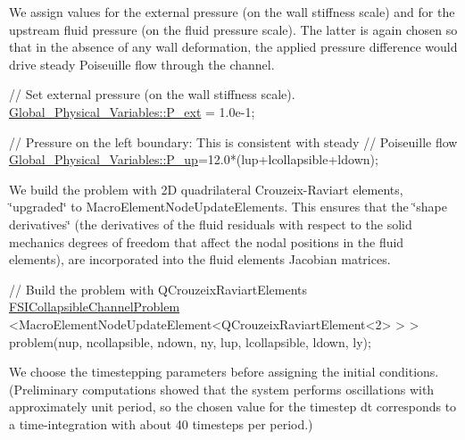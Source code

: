 We assign values for the external pressure (on the wall stiffness scale) and for the upstream fluid pressure (on the fluid pressure scale). The latter is again chosen so that in the absence of any wall deformation, the applied pressure difference would drive steady Poiseuille flow through the channel.


\begin{DoxyCodeInclude}
 
 \textcolor{comment}{// Set external pressure (on the wall stiffness scale). }
 \hyperlink{namespaceGlobal__Physical__Variables_a0406c0cbd463d1df2458fe5de98a00eb}{Global\_Physical\_Variables::P\_ext} = 1.0e-1;
 
 \textcolor{comment}{// Pressure on the left boundary: This is consistent with steady}
 \textcolor{comment}{// Poiseuille flow}
 \hyperlink{namespaceGlobal__Physical__Variables_ae1a493695b7f4619af32f405b0b28861}{Global\_Physical\_Variables::P\_up}=12.0*(lup+lcollapsible+ldown);

\end{DoxyCodeInclude}


We build the problem with 2D quadrilateral Crouzeix-\/\+Raviart elements, \char`\"{}upgraded\char`\"{} to {\ttfamily Macro\+Element\+Node\+Update\+Elements}. This ensures that the \char`\"{}shape
derivatives\char`\"{} (the derivatives of the fluid residuals with respect to the solid mechanics degrees of freedom that affect the nodal positions in the fluid elements), are incorporated into the fluid elements\textquotesingle{} Jacobian matrices.


\begin{DoxyCodeInclude}
 \textcolor{comment}{// Build the problem with QCrouzeixRaviartElements}
 \hyperlink{classFSICollapsibleChannelProblem}{FSICollapsibleChannelProblem}
  <MacroElementNodeUpdateElement<QCrouzeixRaviartElement<2> > > 
  problem(nup, ncollapsible, ndown, ny, 
          lup, lcollapsible, ldown, ly);

\end{DoxyCodeInclude}


We choose the timestepping parameters before assigning the initial conditions. (Preliminary computations showed that the system performs oscillations with approximately unit period, so the chosen value for the timestep {\ttfamily dt} corresponds to a time-\/integration with about 40 timesteps per period.)


